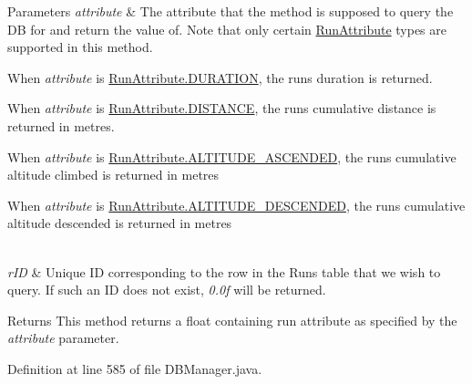 \begin{DoxyParams}{Parameters}
{\em attribute} & The attribute that the method is supposed to query the DB for and return the value of. Note that only certain \hyperlink{enumcom_1_1activitytracker_1_1_run_attribute}{Run\+Attribute} types are supported in this method.
\begin{DoxyItemize}
\item When {\itshape attribute} is \hyperlink{enumcom_1_1activitytracker_1_1_run_attribute_a7adf133b2a62f1f99ffc2adfb7097ec9}{Run\+Attribute.\+D\+U\+R\+A\+T\+I\+ON}, the run\textquotesingle{}s duration is returned.
\item When {\itshape attribute} is \hyperlink{enumcom_1_1activitytracker_1_1_run_attribute_a90ee541e68e458a0bb3f5ea45fd46ec0}{Run\+Attribute.\+D\+I\+S\+T\+A\+N\+CE}, the run\textquotesingle{}s cumulative distance is returned in metres.
\item When {\itshape attribute} is \hyperlink{enumcom_1_1activitytracker_1_1_run_attribute_abcfe85bf48187d67842a0525c1bcc0af}{Run\+Attribute.\+A\+L\+T\+I\+T\+U\+D\+E\+\_\+\+A\+S\+C\+E\+N\+D\+ED}, the run\textquotesingle{}s cumulative altitude climbed is returned in metres
\item When {\itshape attribute} is \hyperlink{enumcom_1_1activitytracker_1_1_run_attribute_a337a68867cfdb8ec7a17c318ad8b216b}{Run\+Attribute.\+A\+L\+T\+I\+T\+U\+D\+E\+\_\+\+D\+E\+S\+C\+E\+N\+D\+ED}, the run\textquotesingle{}s cumulative altitude descended is returned in metres 
\end{DoxyItemize}\\
\hline
{\em r\+ID} & Unique ID corresponding to the row in the Runs table that we wish to query. If such an ID does not exist, {\itshape 0.\+0f} will be returned.\\
\hline
\end{DoxyParams}
\begin{DoxyReturn}{Returns}
This method returns a float containing run attribute as specified by the {\itshape attribute} parameter. 
\end{DoxyReturn}


Definition at line 585 of file D\+B\+Manager.\+java.


